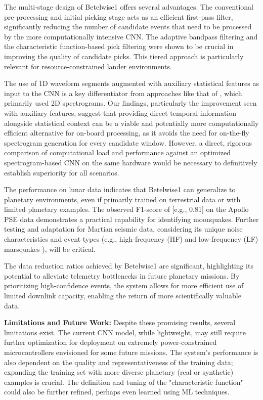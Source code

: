 \documentclass[11pt,a4paper]{article}
\begin{document}
The multi-stage design of Betelwise1 offers several advantages. The conventional pre-processing and initial picking stage acts as an efficient first-pass filter, significantly reducing the number of candidate events that need to be processed by the more computationally intensive CNN. The adaptive bandpass filtering and the characteristic function-based pick filtering were shown to be crucial in improving the quality of candidate picks. This tiered approach is particularly relevant for resource-constrained lander environments.

The use of 1D waveform segments augmented with auxiliary statistical features as input to the CNN is a key differentiator from approaches like that of \citet{civilini2021detecting}, which primarily used 2D spectrograms. Our findings, particularly the improvement seen with auxiliary features, suggest that providing direct temporal information alongside statistical context can be a viable and potentially more computationally efficient alternative for on-board processing, as it avoids the need for on-the-fly spectrogram generation for every candidate window. However, a direct, rigorous comparison of computational load and performance against an optimized spectrogram-based CNN on the same hardware would be necessary to definitively establish superiority for all scenarios.

The performance on lunar data indicates that Betelwise1 can generalize to planetary environments, even if primarily trained on terrestrial data or with limited planetary examples. The observed F1-score of [e.g., 0.81] on the Apollo PSE data demonstrates a practical capability for identifying moonquakes. Further testing and adaptation for Martian seismic data, considering its unique noise characteristics and event types (e.g., high-frequency (HF) and low-frequency (LF) marsquakes \citep{giardini2020seismicity}), will be critical.

The data reduction ratios achieved by Betelwise1 are significant, highlighting its potential to alleviate telemetry bottlenecks in future planetary missions. By prioritizing high-confidence events, the system allows for more efficient use of limited downlink capacity, enabling the return of more scientifically valuable data.

\textbf{Limitations and Future Work:}
Despite these promising results, several limitations exist. The current CNN model, while lightweight, may still require further optimization for deployment on extremely power-constrained microcontrollers envisioned for some future missions. The system's performance is also dependent on the quality and representativeness of the training data; expanding the training set with more diverse planetary (real or synthetic) examples is crucial. The definition and tuning of the "characteristic function" could also be further refined, perhaps even learned using ML techniques.
\end{document}
